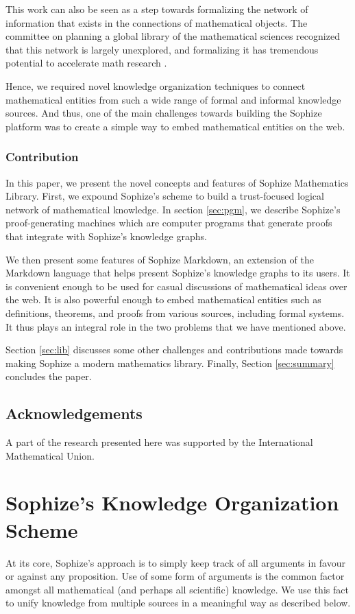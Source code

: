 \documentclass[a4paper]{article}
\begin{document}
This work can also be seen as a step towards formalizing the network of information that exists in the connections of mathematical objects. The committee on planning a global library of the mathematical sciences recognized that this network is largely unexplored, and formalizing it has tremendous potential to accelerate math research \cite{sciences2014developing}.

Hence, we required novel knowledge organization techniques to connect mathematical entities from such a wide range of formal and informal knowledge sources. And thus, one of the main challenges towards building the Sophize platform was to create a simple way to embed mathematical entities on the web.

\subsubsection*{Contribution}
In this paper, we present the novel concepts and features of Sophize Mathematics Library. First, we expound Sophize's scheme to build a trust-focused logical network of mathematical knowledge. In section \ref{sec:pgm}, we describe Sophize's proof-generating machines which are computer programs that generate proofs that integrate with Sophize's knowledge graphs.

We then present some features of Sophize Markdown, an extension of the Markdown language that helps present Sophize's knowledge graphs to its users. It is convenient enough to be used for casual discussions of mathematical ideas over the web. It is also powerful enough to embed mathematical entities such as definitions, theorems, and proofs from various sources, including formal systems. It thus plays an integral role in the two problems that we have mentioned above.

Section \ref{sec:lib} discusses some other challenges and contributions made towards making Sophize a modern mathematics library. Finally, Section \ref{sec:summary} concludes the paper.


\subsection*{Acknowledgements}
A part of the research presented here was supported by the International Mathematical Union.

\section{Sophize's Knowledge Organization Scheme}
At its core, Sophize's approach is to simply keep track of all arguments in favour or against any proposition. Use of some form of arguments is the common factor amongst all mathematical (and perhaps all scientific) knowledge. We use this fact to unify knowledge from multiple sources in a meaningful way as described below.
\end{document}
